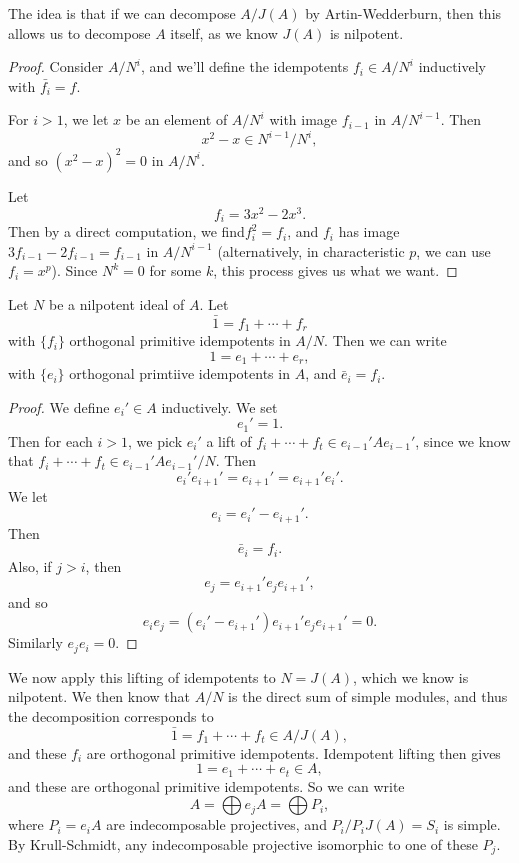 \documentclass[a4paper]{article}
\begin{document}
The idea is that if we can decompose $A/J(A)$ by Artin-Wedderburn, then this allows us to decompose $A$ itself, as we know $J(A)$ is nilpotent.
\begin{proof}
  Consider $A/N^i$, and we'll define the idempotents $f_i \in A/N^i$ inductively with $\bar{f_i} = f$.

  For $i > 1$, we let $x$ be an element of $A/N^i$ with image $f_{i - 1}$ in $A/N^{i - 1}$. Then
  \[
    x^2 - x \in N^{i - 1}/N^i,
  \]
  and so $(x^2 - x)^2 = 0$ in $A/N^i$.

  Let
  \[
    f_i = 3x^2 - 2x^3.
  \]
  Then by a direct computation, we find$f_i^2 = f_i$, and $f_i$ has image $3f_{i - 1} - 2 f_{i - 1} = f_{i - 1}$ in $A/N^{i - 1}$ (alternatively, in characteristic $p$, we can use $f_i = x^p$). Since $N^k = 0$ for some $k$, this process gives us what we want.
\end{proof}

\begin{cor}
  Let $N$ be a nilpotent ideal of $A$. Let
  \[
    \bar{1} = f_1 + \cdots + f_r
  \]
  with $\{f_i\}$ orthogonal primitive idempotents in $A/N$. Then we can write
  \[
    1 = e_1 + \cdots + e_r,
  \]
  with $\{e_i\}$ orthogonal primtiive idempotents in $A$, and $\bar{e}_i = f_i$.
\end{cor}

\begin{proof}
  We define $e_i' \in A$ inductively. We set
  \[
    e_1' = 1.
  \]
  Then for each $i > 1$, we pick $e_i'$ a lift of $f_i + \cdots + f_t \in e_{i - 1}' A e_{i - 1}'$, since we know that $f_i + \cdots + f_t \in e_{i - 1}' A e_{i - 1}'/N$. Then
  \[
    e_i' e_{i + 1}' = e_{i + 1}' = e_{i + 1}' e_i'.
  \]
  We let
  \[
    e_i = e_i'- e_{i + 1}'.
  \]
  Then
  \[
    \bar{e}_i = f_i.
  \]
  Also, if $j > i$, then
  \[
    e_j = e_{i + 1}' e_j e_{i + 1}',
  \]
  and so
  \[
    e_i e_j = (e_i' - e_{i + 1}') e_{i + 1}' e_j e_{i + 1}' = 0.
  \]
  Similarly $e_j e_i = 0$.
\end{proof}

We now apply this lifting of idempotents to $N = J(A)$, which we know is nilpotent. We then know that $A/N$ is the direct sum of simple modules, and thus the decomposition corresponds to
\[
  \bar{1} = f_1 + \cdots + f_t \in A/J(A),
\]
and these $f_i$ are orthogonal primitive idempotents. Idempotent lifting then gives
\[
  1 = e_1 + \cdots + e_t \in A,
\]
and these are orthogonal primitive idempotents. So we can write
\[
  A = \bigoplus e_j A = \bigoplus P_i,
\]
where $P_i = e_i A$ are indecomposable projectives, and $P_i/P_i J(A) = S_i$ is simple. By Krull-Schmidt, any indecomposable projective isomorphic to one of these $P_j$.
\end{document}

